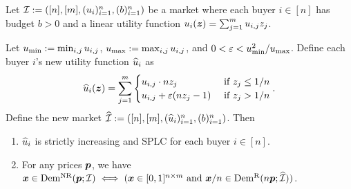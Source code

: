 \begin{lemma}
\label{thm:rivalize-1}
Let $\mathcal{I} := ([n], [m], (u_i)_{i=1}^n, (b)_{i=1}^n)$ be a market where each buyer $i \in [n]$
has budget $b > 0$ and a linear utility function $u_i(\bm{z}) = \sum_{j=1}^m u_{i,j}z_j$.

Let $u_{\min} := \min_{i,j} u_{i,j}$, $u_{\max} := \max_{i,j} u_{i,j}$, and $0 < \varepsilon < u_{\min}^2/u_{\max}$.
Define each buyer $i$'s new utility function $\widehat{u}_i$ as
\[ \widehat{u}_i(\bm{z})
    = \sum_{j=1}^m \begin{cases}u_{i,j} \cdot nz_j & \text{ if } z_j \le 1/n
        \\ u_{i,j} + \varepsilon(nz_j - 1) & \text{ if } z_j > 1/n\end{cases}. \]
Define the new market $\widehat{\mathcal{I}} := ([n], [m], (\widehat{u}_i)_{i=1}^n, (b)_{i=1}^n)$. Then
\begin{enumerate}
\item $\widehat{u}_i$ is strictly increasing and SPLC for each buyer $i \in [n]$.
\item For any prices $\bm{p}$, we have $\bm{x} \in \operatorname{Dem^{\mathrm{NR}}}(\bm{p}; \mathcal{I}) \iff
    (\bm{x} \in [0, 1]^{n \times m} \text{ and } \bm{x}/n \in \operatorname{Dem^{\mathrm{R}}}(n\bm{p}; \widehat{\mathcal{I}}))$.
\end{enumerate}
\end{lemma}
